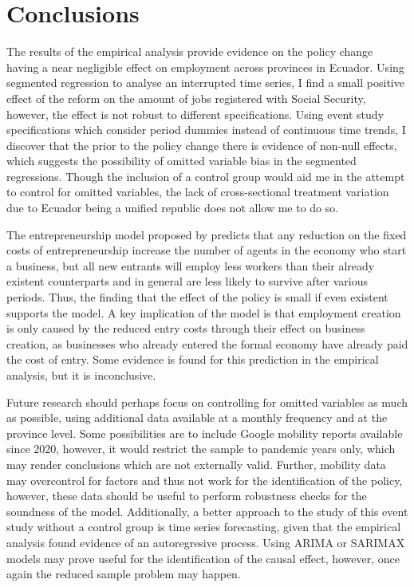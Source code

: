 \documentclass[11pt,a4paper]{article}\usepackage[]{graphicx}\usepackage[]{xcolor}
\begin{document}
\section{Conclusions}

The results of the empirical analysis provide evidence on the policy change having a near negligible effect on employment across provinces in Ecuador. Using segmented regression to analyse an interrupted time series, I find a small positive effect of the reform on the amount of jobs registered with Social Security, however, the effect is not robust to different specifications. Using event study specifications which consider period dummies instead of continuous time trends, I discover that the prior to the policy change there is evidence of non-null effects, which suggests the possibility of omitted variable bias in the segmented regressions. Though the inclusion of a control group would aid me in the attempt to control for omitted variables, the lack of cross-sectional treatment variation due to Ecuador being a unified republic does not allow me to do so. 

The entrepreneurship model proposed by \textcite{Branstetter.2014} predicts that any reduction on the fixed costs of entrepreneurship increase the number of agents in the economy who start a business, but all new entrants will employ less workers than their already existent counterparts and in general are less likely to survive after various periods. Thus, the finding that the effect of the policy is small if even existent supports the model. A key implication of the model is that employment creation is only caused by the reduced entry costs through their effect on business creation, as businesses who already entered the formal economy have already paid the cost of entry. Some evidence is found for this prediction in the empirical analysis, but it is inconclusive. 

Future research should perhaps focus on controlling for omitted variables as much as possible, using additional data available at a monthly frequency and at the province level. Some possibilities are to include Google mobility reports available since 2020, however, it would restrict the sample to pandemic years only, which may render conclusions which are not externally valid. Further, mobility data may overcontrol for factors and thus not work for the identification of the policy, however, these data should be useful to perform robustness checks for the soundness of the model. Additionally, a better approach to the study of this event study without a control group is time series forecasting, given that the empirical analysis found evidence of an autoregresive process. Using ARIMA or SARIMAX models may prove useful for the identification of the causal effect, however, once again the reduced sample problem may happen. 
\end{document}
